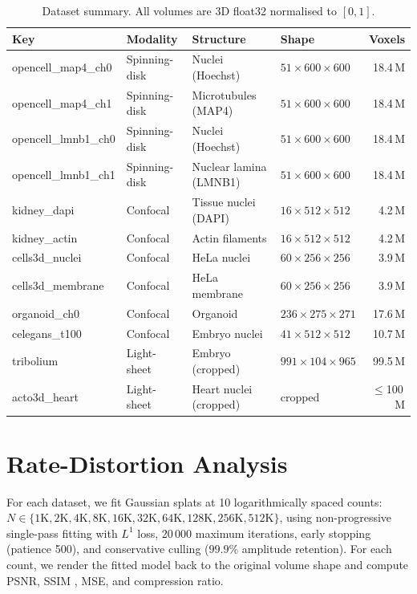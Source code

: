 \documentclass[11pt, a4paper]{article}
\theoremstyle{plain}
\theoremstyle{definition}
\theoremstyle{remark}
\begin{document}
\begin{table}[H]
\centering
\caption{Dataset summary. All volumes are 3D float32 normalised to $[0,1]$.}
\label{tab:datasets}
\small
\begin{tabular}{@{}llllr@{}}
\toprule
Key & Modality & Structure & Shape & Voxels \\
\midrule
opencell\_map4\_ch0\cite{cho2022opencell} & Spinning-disk & Nuclei (Hoechst) & $51\times600\times600$ & 18.4\,M \\
opencell\_map4\_ch1 & Spinning-disk & Microtubules (MAP4) & $51\times600\times600$ & 18.4\,M \\
opencell\_lmnb1\_ch0 & Spinning-disk & Nuclei (Hoechst) & $51\times600\times600$ & 18.4\,M \\
opencell\_lmnb1\_ch1 & Spinning-disk & Nuclear lamina (LMNB1) & $51\times600\times600$ & 18.4\,M \\
kidney\_dapi & Confocal & Tissue nuclei (DAPI) & $16\times512\times512$ & 4.2\,M \\
kidney\_actin & Confocal & Actin filaments & $16\times512\times512$ & 4.2\,M \\
cells3d\_nuclei & Confocal & HeLa nuclei & $60\times256\times256$ & 3.9\,M \\
cells3d\_membrane & Confocal & HeLa membrane & $60\times256\times256$ & 3.9\,M \\
organoid\_ch0 & Confocal & Organoid & $236\times275\times271$ & 17.6\,M \\
celegans\_t100 & Confocal & Embryo nuclei & $41\times512\times512$ & 10.7\,M \\
tribolium & Light-sheet & Embryo (cropped) & $991\times104\times965$ & 99.5\,M \\
acto3d\_heart & Light-sheet & Heart nuclei (cropped) & cropped & $\le$100\,M \\
\bottomrule
\end{tabular}
\end{table}


\section{Rate-Distortion Analysis}
\label{sec:rate-distortion}

For each dataset, we fit Gaussian splats at 10 logarithmically spaced
counts: $N \in \{1\text{K}, 2\text{K}, 4\text{K}, 8\text{K}, 16\text{K},
32\text{K}, 64\text{K}, 128\text{K}, 256\text{K}, 512\text{K}\}$, using
non-progressive single-pass fitting with $L^1$ loss, 20\,000 maximum
iterations, early stopping (patience 500), and conservative culling
($99.9\%$ amplitude retention). For each count, we render the fitted
model back to the original volume shape and compute PSNR, SSIM
\citep{wang2004ssim}, MSE, and compression ratio.
\end{document}

